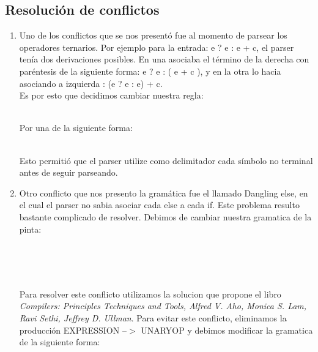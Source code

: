 \subsection{Resolución de conflictos}
\begin{enumerate}
    
\item Uno de los conflictos que se nos presentó fue al momento de parsear los
operadores ternarios. Por ejemplo para la entrada: e ? e : e + c, el parser
tenía dos derivaciones posibles. En una asociaba el término de la derecha con
paréntesis de la siguiente forma: e ? e : ( e + c ), y en la otra lo hacia
asociando a izquierda : (e ? e : e) + c. \\
Es por esto que decidimos cambiar nuestra regla: 
\\
\begin{reglas}
\end{reglas}
\\
Por una de la siguiente forma:
\\
\begin{reglas}
\end{reglas}
\\
Esto permitió que el parser utilize como delimitador cada símbolo no terminal
antes de seguir parseando.

\item Otro conflicto que nos presento la gramática fue el llamado Dangling
  else, en el cual el parser no sabia asociar cada else a cada if. Este
  problema resulto bastante complicado de resolver. Debimos de cambiar nuestra
  gramatica de la pinta:
  \begin{reglas}
    \\
    \\
    \\
    \aregla{\LAMBDA}
  \end{reglas}
  Para resolver este conflicto utilizamos la solucion que propone el libro
  \textit{Compilers: Principles Techniques and Tools, Alfred V. Aho, Monica S.
  Lam, Ravi Sethi, Jeffrey D. Ullman}. Para evitar este conflicto, eliminamos la producción
  EXPRESSION --$>$ UNARYOP y debimos modificar la gramatica de la siguiente forma:


\end{enumerate}
